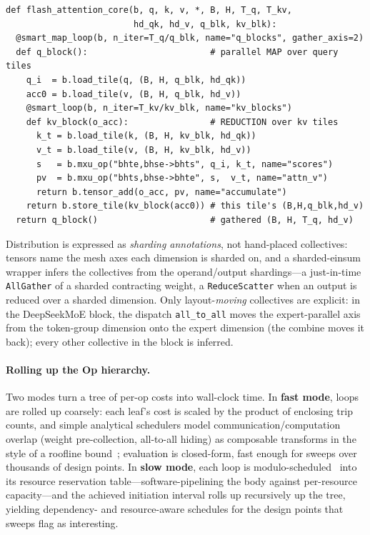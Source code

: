 \documentclass{article}
\begin{document}
\begin{lstlisting}[style=dsl,float=tb,caption={},title={Listing 1: the flash-attention core in the builder DSL.}]
def flash_attention_core(b, q, k, v, *, B, H, T_q, T_kv,
                         hd_qk, hd_v, q_blk, kv_blk):
  @smart_map_loop(b, n_iter=T_q/q_blk, name="q_blocks", gather_axis=2)
  def q_block():                        # parallel MAP over query tiles
    q_i  = b.load_tile(q, (B, H, q_blk, hd_qk))
    acc0 = b.load_tile(v, (B, H, q_blk, hd_v))
    @smart_loop(b, n_iter=T_kv/kv_blk, name="kv_blocks")
    def kv_block(o_acc):                # REDUCTION over kv tiles
      k_t = b.load_tile(k, (B, H, kv_blk, hd_qk))
      v_t = b.load_tile(v, (B, H, kv_blk, hd_v))
      s   = b.mxu_op("bhte,bhse->bhts", q_i, k_t, name="scores")
      pv  = b.mxu_op("bhts,bhse->bhte", s,  v_t, name="attn_v")
      return b.tensor_add(o_acc, pv, name="accumulate")
    return b.store_tile(kv_block(acc0)) # this tile's (B,H,q_blk,hd_v)
  return q_block()                      # gathered (B, H, T_q, hd_v)
\end{lstlisting}

Distribution is expressed as \emph{sharding annotations}, not hand-placed
collectives: tensors name the mesh axes each dimension is sharded on, and a
sharded-einsum wrapper infers the collectives from the operand/output
shardings---a just-in-time \texttt{AllGather} of a sharded contracting weight,
a \texttt{ReduceScatter} when an output is reduced over a sharded dimension.
Only layout-\emph{moving} collectives are explicit: in the DeepSeekMoE block,
the dispatch \texttt{all\_to\_all} moves the expert-parallel axis from the
token-group dimension onto the expert dimension (the combine moves it back);
every other collective in the block is inferred.

\paragraph{Rolling up the Op hierarchy.} Two modes turn a tree of per-op costs
into wall-clock time. In \textbf{fast mode}, loops are rolled up coarsely:
each leaf's cost is scaled by the product of enclosing trip counts, and simple
analytical schedulers model communication/computation overlap (weight
pre-collection, all-to-all hiding) as composable transforms in the style of a
roofline bound~\citep{williams2009roofline}; evaluation is closed-form, fast enough for sweeps over thousands of design points. In
\textbf{slow mode}, each loop is modulo-scheduled~\citep{rau1994iterative}
into its resource reservation table---software-pipelining the body against
per-resource capacity---and the achieved initiation interval rolls up
recursively up the tree, yielding dependency- and resource-aware schedules for
the design points that sweeps flag as interesting.
\end{document}
